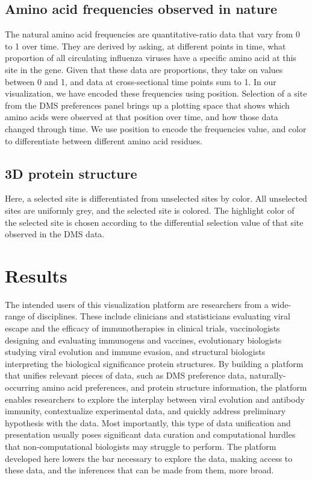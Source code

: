 \documentclass[sigchi]{acmart}
\begin{document}
\subsection{Amino acid frequencies observed in nature}
The natural amino acid frequencies are quantitative-ratio data that vary from 0 to 1 over time. They are derived by asking, at different points in time, what proportion of all circulating influenza viruses have a specific amino acid at this site in the gene. Given that these data are proportions, they take on values between 0 and 1, and data at cross-sectional time points sum to 1. In our visualization, we have encoded these frequencies using position. Selection of a site from the DMS preferences panel brings up a plotting space that shows which amino acids were observed at that position over time, and how those data changed through time. We use position to encode the frequencies value, and color to differentiate between different amino acid residues.

\subsection{3D protein structure}
Here, a selected site is differentiated from unselected sites by color. All unselected sites are uniformly grey, and the selected site is colored. The highlight color of the selected site is chosen according to the differential selection value of that site observed in the DMS data.

\section{Results}

The intended users of this visualization platform are researchers from a wide-range of disciplines. These include clinicians and statisticians evaluating viral escape and the efficacy of immunotherapies in clinical trials, vaccinologists designing and evaluating immunogens and vaccines, evolutionary biologists studying viral evolution and immune evasion, and structural biologists interpreting the biological significance protein structures. By building a platform that unifies relevant pieces of data, such as DMS preference data, naturally-occurring amino acid preferences, and protein structure information, the platform enables researchers to explore the interplay between viral evolution and antibody immunity, contextualize experimental data, and quickly address preliminary hypothesis with the data. Most importantly, this type of data unification and presentation usually poses significant data curation and computational hurdles that non-computational biologists may struggle to perform. The platform developed here lowers the bar necessary to explore the data, making access to these data, and the inferences that can be made from them, more broad.
\end{document}
